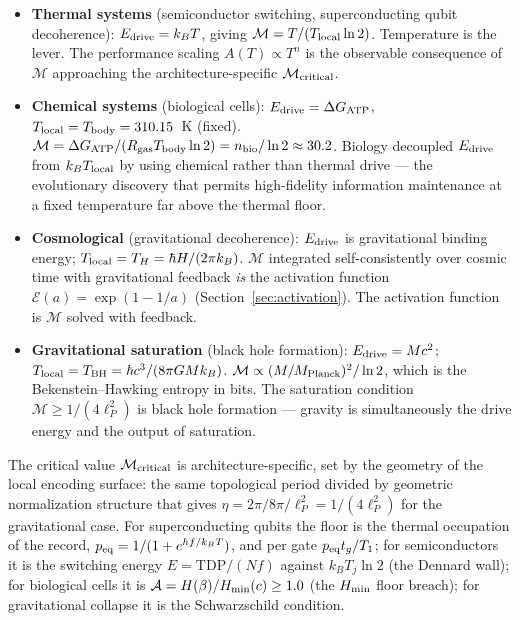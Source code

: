\documentclass[12pt,a4paper]{article}
\begin{document}
\begin{itemize}
\item \textbf{Thermal systems} (semiconductor switching, superconducting
  qubit decoherence): $E_{\rm drive} = k_B T$, giving
  $\mathcal{M} = T/(T_{\rm local}\ln 2)$. Temperature is the lever.
  The performance scaling $A(T) \propto T^n$ is the observable consequence
  of $\mathcal{M}$ approaching the architecture-specific $\mathcal{M}_{\rm critical}$.

\item \textbf{Chemical systems} (biological cells): $E_{\rm drive} = \Delta G_{\rm ATP}$,
  $T_{\rm local} = T_{\rm body} = 310.15$~K (fixed). $\mathcal{M} =
  \Delta G_{\rm ATP}/(R_{\rm gas} T_{\rm body} \ln 2) = n_{\rm bio}/\ln 2 \approx 30.2$.
  Biology decoupled $E_{\rm drive}$ from $k_B T_{\rm local}$ by using
  chemical rather than thermal drive --- the evolutionary discovery that
  permits high-fidelity information maintenance at a fixed temperature far
  above the thermal floor.

\item \textbf{Cosmological} (gravitational decoherence): $E_{\rm drive}$
  is gravitational binding energy; $T_{\rm local} = T_H = \hbar H/(2\pi k_B)$.
  $\mathcal{M}$ integrated self-consistently over cosmic time with
  gravitational feedback \emph{is} the activation function
  $\mathcal{E}(a) = \exp(1 - 1/a)$ (Section~\ref{sec:activation}).
  The activation function is $\mathcal{M}$ solved with feedback.

\item \textbf{Gravitational saturation} (black hole formation):
  $E_{\rm drive} = Mc^2$; $T_{\rm local} = T_{\rm BH} = \hbar c^3/(8\pi G M k_B)$.
  $\mathcal{M} \propto (M/M_{\rm Planck})^2/\ln 2$, which is the
  Bekenstein--Hawking entropy in bits. The saturation condition
  $\mathcal{M} \geq 1/(4\ell_P^2)$ is black hole formation --- gravity
  is simultaneously the drive energy and the output of saturation.
\end{itemize}

The critical value $\mathcal{M}_{\rm critical}$ is architecture-specific,
set by the geometry of the local encoding surface: the same topological
period divided by geometric normalization structure that gives
$\eta = 2\pi/8\pi/\ell_P^2 = 1/(4\ell_P^2)$ for the gravitational case.
For superconducting qubits the floor is the thermal occupation of the record, $p_{\rm eq}=1/(1+e^{hf/k_BT})$,
and per gate $p_{\rm eq}t_g/T_1$; for semiconductors it is the switching energy $E=\mathrm{TDP}/(Nf)$ against $k_BT_j\ln 2$
(the Dennard wall); for biological cells it is $\mathcal{A} = H(\beta)/H_{\rm min}(c) \geq 1.0$
(the $H_{\rm min}$ floor breach); for gravitational collapse it is
the Schwarzschild condition.
\end{document}
